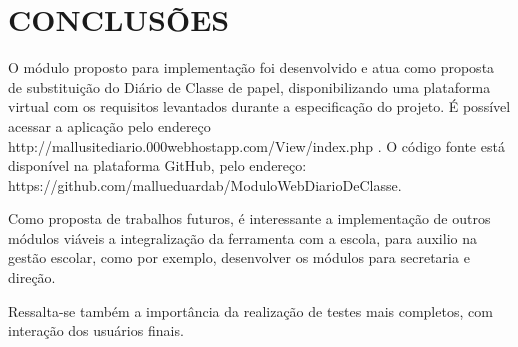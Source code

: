 \chapter{CONCLUSÕES}
\label{cap:conclusao}


O módulo proposto para implementação foi desenvolvido e atua como proposta de substituição do Diário de Classe de papel, disponibilizando uma plataforma virtual com os requisitos levantados durante a especificação do projeto.
 É possível acessar a aplicação pelo endereço http://mallusitediario.000webhostapp.com/View/index.php . O código fonte está disponível na plataforma GitHub, pelo endereço:  https://github.com/mallueduardab/ModuloWebDiarioDeClasse.

Como proposta de trabalhos futuros, é interessante a implementação de outros módulos viáveis a integralização da ferramenta com a escola, para auxilio na gestão escolar, como por exemplo, desenvolver os módulos para secretaria e direção.

Ressalta-se também a importância da realização de testes mais completos, com interação dos usuários finais. 